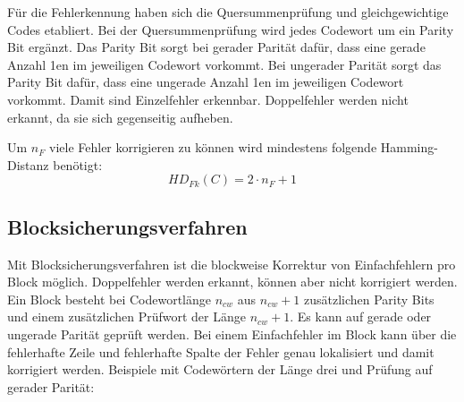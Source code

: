 Für die Fehlerkennung haben sich die Quersummenprüfung und gleichgewichtige Codes etabliert. Bei der Quersummenprüfung wird jedes Codewort um ein Parity Bit ergänzt. Das Parity Bit sorgt bei gerader Parität dafür, dass eine gerade Anzahl 1en im jeweiligen Codewort vorkommt. Bei ungerader Parität sorgt das Parity Bit dafür, dass eine ungerade Anzahl 1en im jeweiligen Codewort vorkommt. Damit sind Einzelfehler erkennbar. Doppelfehler werden nicht erkannt, da sie sich gegenseitig aufheben.

Um $n_F$ viele Fehler korrigieren zu können wird mindestens folgende Hamming-Distanz benötigt:
$$ HD_{Fk}(C) = 2 \cdot n_F + 1 $$

\subsection{Blocksicherungsverfahren}
Mit Blocksicherungsverfahren ist die blockweise Korrektur von Einfachfehlern pro Block möglich. Doppelfehler werden erkannt, können aber nicht korrigiert werden. Ein Block besteht bei Codewortlänge $n_{cw}$ aus $n_{cw} + 1$ zusätzlichen Parity Bits und einem zusätzlichen Prüfwort der Länge $n_{cw} + 1$. Es kann auf gerade oder ungerade Parität geprüft werden. Bei einem Einfachfehler im Block kann über die fehlerhafte Zeile und fehlerhafte Spalte der Fehler genau lokalisiert und damit korrigiert werden. Beispiele mit Codewörtern der Länge drei und Prüfung auf gerader Parität:
